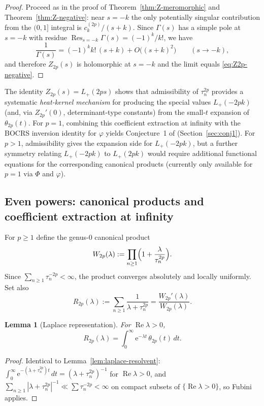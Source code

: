 \documentclass[11pt,letterpaper]{amsart}
\numberwithin{equation}{section}
\newtheorem{lemma}[theorem]{Lemma}
\theoremstyle{definition}
\newcommand{\Ree}{\operatorname{Re}}
\newcommand{\e}{\mathrm{e}}
\newcommand{\Res}{\operatorname{Res}}
\begin{document}
\begin{proof}
Proceed as in the proof of Theorem~\ref{thm:Z-meromorphic} and Theorem~\ref{thm:Z-negative}:
near $s=-k$ the only potentially singular contribution from the $(0,1]$ integral is $c^{(2p)}_k/(s+k)$.
Since $\Gamma(s)$ has a simple pole at $s=-k$ with residue $\Res_{s=-k}\Gamma(s)=(-1)^k/k!$,
we have
\[
\frac{1}{\Gamma(s)} = (-1)^k k!\,(s+k)+O\!\bigl((s+k)^2\bigr)\qquad(s\to-k),
\]
and therefore $Z_{2p}(s)$ is holomorphic at $s=-k$ and the limit equals \eqref{eq:Z2p-negative}.
\end{proof}


The identity $Z_{2p}(s)=L_+(2ps)$ shows that admissibility of $\tau_n^{2p}$ provides a systematic
\emph{heat-kernel mechanism} for producing the special values $L_+(-2pk)$ (and, via $Z_{2p}'(0)$,
determinant-type constants) from the small-$t$ expansion of $\theta_{2p}(t)$.
For $p=1$, combining this coefficient extraction at infinity with the BOCRS inversion identity
for $\varphi$ yields Conjecture~1 of \cite{BOCRS} (Section~\ref{sec:conj1}).
For $p>1$, admissibility gives the expansion side for $L_+(-2pk)$, but a further symmetry
relating $L_+(-2pk)$ to $L_+(2pk)$ would require additional functional equations for the corresponding
canonical products (currently only available for $p=1$ via $\Phi$ and $\varphi$).

\subsection{Even powers: canonical products and coefficient extraction at infinity}

For $p\ge1$ define the genus-$0$ canonical product
\begin{equation}\label{eq:def-W2p}
W_{2p}(\lambda):=\prod_{n\ge1}\Bigl(1+\frac{\lambda}{\tau_n^{2p}}\Bigr).
\end{equation}
Since $\sum_{n\ge1}\tau_n^{-2p}<\infty$, the product converges absolutely and locally uniformly.
Set also
\[
R_{2p}(\lambda):=\sum_{n\ge1}\frac{1}{\lambda+\tau_n^{2p}}=\frac{W_{2p}'(\lambda)}{W_{2p}(\lambda)}.
\]

\begin{lemma}[Laplace representation]\label{lem:laplace-resolvent-2p}
For $\Ree\lambda>0$,
\[
R_{2p}(\lambda)=\int_0^\infty \e^{-\lambda t}\,\theta_{2p}(t)\,dt.
\]
\end{lemma}

\begin{proof}
Identical to Lemma~\ref{lem:laplace-resolvent}:
$\int_0^\infty\e^{-(\lambda+\tau_n^{2p})t}\,dt=(\lambda+\tau_n^{2p})^{-1}$ for $\Ree\lambda>0$,
and $\sum_{n\ge1}|\lambda+\tau_n^{2p}|^{-1}\ll \sum\tau_n^{-2p}<\infty$ on compact subsets of $\{\Ree\lambda>0\}$,
so Fubini applies.
\end{proof}
\end{document}
